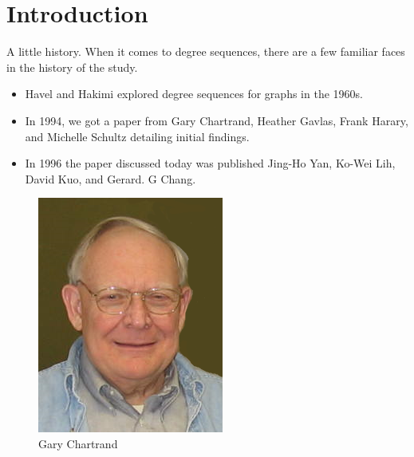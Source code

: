 \section{Introduction}


\begin{frame}{A little history.}
	When it comes to degree sequences, there are a few familiar faces in the history of the study.
		\begin{itemize}
			\item Havel and Hakimi explored degree sequences for graphs in the 1960s.
			\item In 1994, we got a paper from Gary Chartrand, Heather Gavlas, Frank Harary, and Michelle Schultz detailing initial findings.
			\item In 1996 the paper discussed today was published Jing-Ho Yan, Ko-Wei Lih, David Kuo, and Gerard. G Chang.
		\end{itemize}
\end{frame}


\begin{frame}
	\begin{figure}
		\centering 
		\includegraphics{GaryChartrand.png}
		\caption[]{Gary Chartrand}
	\end{figure}
\end{frame}


